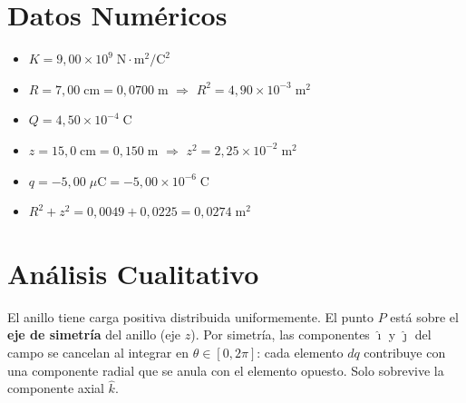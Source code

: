 \documentclass[12pt,letterpaper]{article}
\begin{document}
\begin{center}
\end{center}

\section*{Datos Num\'ericos}

\begin{itemize}
    \item $K = 9{,}00\times10^9\;\text{N}\cdot\text{m}^2/\text{C}^2$
    \item $R = 7{,}00\;\text{cm} = 0{,}0700\;\text{m}$ \quad $\Rightarrow$ \quad $R^2 = 4{,}90\times10^{-3}\;\text{m}^2$
    \item $Q = 4{,}50\times10^{-4}\;\text{C}$
    \item $z = 15{,}0\;\text{cm} = 0{,}150\;\text{m}$ \quad $\Rightarrow$ \quad $z^2 = 2{,}25\times10^{-2}\;\text{m}^2$
    \item $q = -5{,}00\;\mu\text{C} = -5{,}00\times10^{-6}\;\text{C}$
    \item $R^2 + z^2 = 0{,}0049 + 0{,}0225 = 0{,}0274\;\text{m}^2$
\end{itemize}

\section*{An\'alisis Cualitativo}

El anillo tiene carga positiva distribuida uniformemente. El punto $P$ est\'a sobre el \textbf{eje de simetr\'ia} del anillo (eje $z$). Por simetr\'ia, las componentes $\hat{\imath}$ y $\hat{\jmath}$ del campo se cancelan al integrar en $\theta \in [0, 2\pi]$: cada elemento $dq$ contribuye con una componente radial que se anula con el elemento opuesto. Solo sobrevive la componente axial $\hat{k}$.
\end{document}
